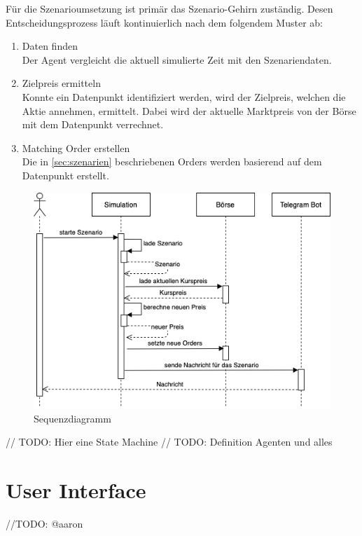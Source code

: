 Für die Szenarioumsetzung ist primär das Szenario-Gehirn zuständig. Desen Entscheidungsprozess läuft kontinuierlich nach dem folgendem Muster ab:
\begin{enumerate}
    \item Daten finden\\
        Der Agent vergleicht die aktuell simulierte Zeit mit den Szenariendaten.
    \item Zielpreis ermitteln\\
        Konnte ein Datenpunkt identifiziert werden, wird der Zielpreis, welchen die Aktie annehmen, ermittelt. Dabei wird der aktuelle Marktpreis von der Börse mit dem Datenpunkt verrechnet.
    \item Matching Order erstellen\\
        Die in \autoref{sec:szenarien} beschriebenen Orders werden basierend auf dem Datenpunkt erstellt.
\end{enumerate}

\begin{figure}[ht]
    \includegraphics[width=\textwidth]{img/Sequenzdiagramm.png}
    \centering
    \caption{Sequenzdiagramm}
    \label{fig:Sequenzdiagramm}
\end{figure}

// TODO: Hier eine State Machine
// TODO: Definition Agenten und alles 

\section{User Interface}
//TODO: @aaron
